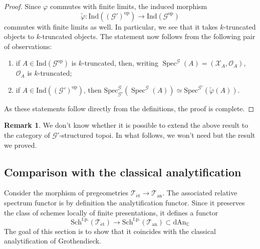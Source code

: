 \documentclass[12pt,a4paper,reqno]{amsart}
\theoremstyle{plain}
\theoremstyle{definition}
\newtheorem{rem}[thm]{Remark}
\theoremstyle{remark}
\numberwithin{equation}{section}
\begin{document}
\begin{proof}
	Since $\varphi$ commutes with finite limits, the induced morphism
	\[ \widetilde{\varphi} \colon \mathrm{Ind}(({\mathcal G}')^{\mathrm{op}}) \to \mathrm{Ind}({\mathcal G}^{\mathrm{op}}) \]
	commutes with finite limits as well.
	In particular, we see that it takes $k$-truncated objects to $k$-truncated objects.
	The statement now follows from the following pair of observations:
	\begin{enumerate}
		\item if $A \in \mathrm{Ind}({\mathcal G}^{\mathrm{op}})$ is $k$-truncated, then, writing $\operatorname{Spec}^{\mathcal G}(A) = ({\mathcal X}_A, {\mathcal O}_A)$, ${\mathcal O}_A$ is $k$-truncated;
		\item if $A \in \mathrm{Ind}(({\mathcal G}')^{\mathrm{op}})$, then $\mathrm{Spec}^{\mathcal G}_{{\mathcal G}'}(\operatorname{Spec}^{\mathcal G}(A)) \simeq \mathrm{Spec}^{{\mathcal G}'}(\widetilde{\varphi}(A))$.
	\end{enumerate}
	As these statements follow directly from the definitions, the proof is complete.
\end{proof}

\begin{rem}
	We don't know whether it is possible to extend the above result to the category of ${\mathcal G}'$-structured topoi.
	In what follows, we won't need but the result we proved.
\end{rem}

\subsection{Comparison with the classical analytification}

Consider the morphism of pregeometries ${{\mathcal T}_{\mathrm{\acute{e}t}}} \to {{\mathcal T}_{\mathrm{an}}}$.
The associated relative spectrum functor is by definition the analytification functor.
Since it preserves the class of schemes locally of finite presentations, it defines a functor
\[ \mathrm{Sch}^{\mathrm{f.p.}}({{\mathcal T}_{\mathrm{\acute{e}t}}}) \to \mathrm{Sch}^{\mathrm{f.p.}}({{\mathcal T}_{\mathrm{an}}}) \subset \mathrm{dAn}_{\mathbb C} \]
The goal of this section is to show that it coincides with the classical analytification of Grothendieck.
\end{document}
